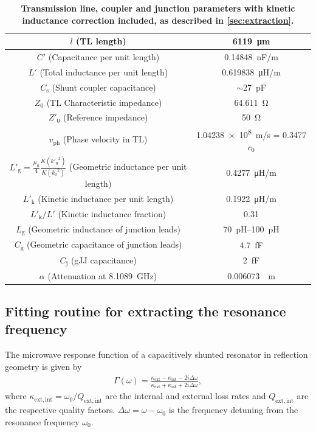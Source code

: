 \begin{table}
	\begin{center}
		\begin{tabular}{|c|c|}
			\hline 
			$l$ (TL length) & \SI{6119}{\micro\meter} \\ 
			\hline 
			$C'$ (Capacitance per unit length) & \SI{0.14848}{nF/m} \\ 
			\hline 
			$L'$ (Total inductance per unit length) & \SI{0.619838}{\micro\henry/m} \\ 
			\hline
			$C_\text{s}$ (Shunt coupler capacitance) & $\sim$\SI{27}{pF} \\ 
			\hline 
			$Z_0$ (TL Characteristic impedance) & \SI{64.611}{\ohm} \\
			\hline 
			$Z'_0$ (Reference impedance) & \SI{50}{\ohm} \\
			\hline 
			$v_\text{ph}$ (Phase velocity in TL) & \SI{1.04238e8}{m/s} = 0.3477 $c_0$ \\ 
			\hline
			$L'_\text{g} = \frac{\mu_0}{4}\frac{K({k'_0}^2)}{K({k_0}^2)}$ (Geometric inductance per unit length) & \SI{0.4277}{\micro\henry/m} \\ 
			\hline
			$L'_\text{k}$ (Kinetic inductance per unit length) & \SI{0.1922}{\micro\henry/m} \\ 
			\hline
			$L'_\text{k}/L'$ (Kinetic inductance fraction) & \num{0.31} \\ 
			\hline
			$L_\text{g}$ (Geometric inductance of junction leads) & \SIrange[range-phrase=--]{70}{100}{pH} \\ 
			\hline
			$C_\text{g}$ (Geometric capacitance of junction leads) & \SI{4.7}{fF} \\ 
			\hline
			$C_\text{j}$ (gJJ capacitance) & \SI{2}{fF} \\ 
			\hline
			$\alpha$ (Attenuation at \SI{8.1089}{GHz}) & \SI{0.006073}{\per\metre} \\ 
			\hline
		\end{tabular}
		\caption{\bf Transmission line, coupler and junction parameters with kinetic inductance correction included, as described in \ref{sec:extraction}.}
		\label{tab:tlpars}
	\end{center}
\end{table}

\clearpage

\subsection{Fitting routine for extracting the resonance frequency}\label{sec:fitting}
\noindent The microwave response function of a capacitively shunted resonator in reflection geometry is given by \cite{pozar_microwave_2012}
\begin{eqnarray}
\Gamma(\omega) = \frac{\kappa_\mathrm{ext}-\kappa_\mathrm{int}-2i\Delta\omega}{\kappa_\mathrm{ext}+\kappa_\mathrm{int}+2i\Delta\omega},
\end{eqnarray}
where $\kappa_\mathrm{ext,int}=\omega_0/Q_\mathrm{ext,int}$ are the internal and external loss rates and $Q_\mathrm{ext,int}$ are the respective quality factors.
$\Delta\omega=\omega-\omega_0$ is the frequency detuning from the resonance frequency $\omega_0$.

